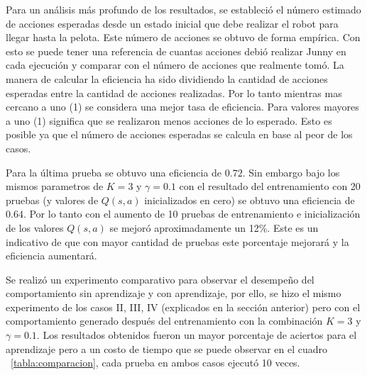 Para un análisis más profundo de los resultados, se estableci\'o el n\'umero estimado de acciones esperadas desde un estado inicial que debe realizar el robot para llegar hasta la pelota. Este número de acciones se obtuvo de forma empírica. Con esto se puede tener una referencia de cuantas acciones debió realizar Junny en cada ejecución y comparar con el número de acciones que realmente tomó. La manera de calcular la eficiencia ha sido dividiendo la cantidad de acciones esperadas entre la cantidad de acciones realizadas. Por lo tanto mientras mas cercano a uno (1) se considera una mejor tasa de eficiencia. Para valores mayores a uno (1) significa que se realizaron menos acciones de lo esperado. Esto es posible ya que el número de acciones esperadas se calcula en base al peor de los casos.  

Para la última prueba se obtuvo una eficiencia de $0.72$. Sin embargo bajo los mismos parametros de $K = 3$ y $ \gamma = 0.1 $ con el resultado del entrenamiento con 20 pruebas (y valores de $Q(s,a)$ inicializados en cero) se obtuvo una eficiencia de $0.64$. Por lo tanto con el aumento de 10 pruebas de entrenamiento e inicialización de los valores $Q(s,a)$ se mejoró aproximadamente un 12\%. Este es un indicativo de que con mayor cantidad de pruebas este porcentaje mejorar\'a y la eficiencia aumentará.


Se realiz\'o un experimento comparativo para observar el desempe\~no del comportamiento sin aprendizaje y con aprendizaje, por ello, se hizo el mismo experimento de los casos II, III, IV (explicados en la sección anterior) pero con el comportamiento generado después del entrenamiento con la combinación $K = 3 $ y $ \gamma = 0.1$. Los resultados obtenidos fueron un mayor porcentaje de aciertos para el aprendizaje pero a un costo de tiempo que se puede observar en el cuadro ~\ref{tabla:comparacion}, cada prueba en ambos casos ejecut\'o 10 veces.

